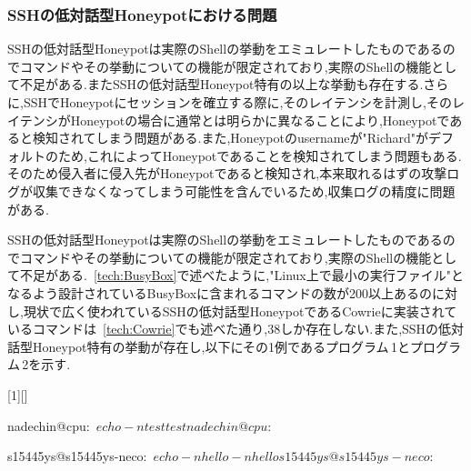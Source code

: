 \subsubsection{SSHの低対話型Honeypotにおける問題}
\label{approach:problemofSshLowHoneypot}
SSHの低対話型Honeypotは実際のShellの挙動をエミュレートしたものであるのでコマンドやその挙動についての機能が限定されており,実際のShellの機能として不足がある.またSSHの低対話型Honeypot特有の以上な挙動も存在する.さらに,SSHでHoneypotにセッションを確立する際に,そのレイテンシを計測し,そのレイテンシがHoneypotの場合に通常とは明らかに異なることにより,Honeypotであると検知されてしまう問題がある.また,Honeypotのusernameが"Richard"がデフォルトのため,これによってHoneypotであることを検知されてしまう問題もある.そのため侵入者に侵入先がHoneypotであると検知され,本来取れるはずの攻撃ログが収集できなくなってしまう可能性を含んでいるため,収集ログの精度に問題がある.

\label{approach:LowHoneypotLatency}

\label{approach:LowHoneypotUsername}

\label{approach:LowHoneypotCommand}
SSHの低対話型Honeypotは実際のShellの挙動をエミュレートしたものであるのでコマンドやその挙動についての機能が限定されており,実際のShellの機能として不足がある.~\ref{tech:BusyBox}で述べたように,"Linux上で最小の実行ファイル"となるよう設計されているBusyBoxに含まれるコマンドの数が200以上あるのに対し,現状で広く使われているSSHの低対話型HoneypotであるCowrieに実装されているコマンドは~\ref{tech:Cowrie}でも述べた通り,38しか存在しない.また,SSHの低対話型Honeypot特有の挙動が存在し,以下にその1例であるプログラム\,1とプログラム\,2を示す.

\vspace{5mm}
[1][]
    {\lstset{
        frame=single,
        basicstyle=\ttfamily,
        numbers=left,
        numbersep=10pt,
        tabsize=2,
        extendedchars=true,
        xleftmargin=17pt,
        framexleftmargin=17pt,
        #1
    }
}{}

\begin{mylisting}[language=sh,caption=正しいShellの挙動]
nadechin@cpu:~$ echo -n test
testnadechin@cpu:~$
\end{mylisting}

\begin{mylisting}[language=sh,caption=Kippo特有の異常な挙動の例]
s15445ys@s15445ys-neco:~$ echo -n hello
-n hello
s15445ys@s15445ys-neco:~$
\end{mylisting}

